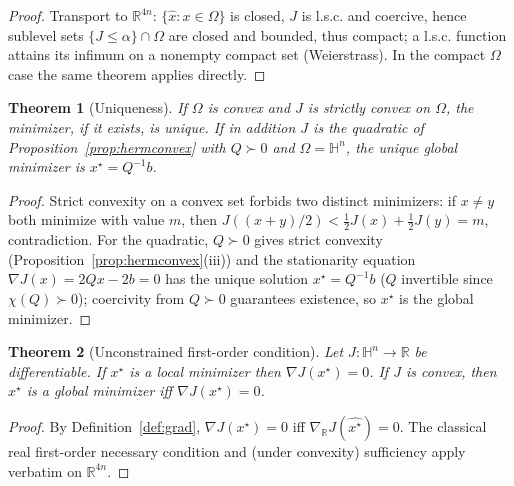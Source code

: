 \documentclass{amsart}
\newtheorem{theorem}{Theorem}
\theoremstyle{definition}
\newcommand{\HH}{\mathbb{H}}
\newcommand{\RR}{\mathbb{R}}
\begin{document}
\begin{proof}
Transport to $\RR^{4n}$: $\{\widehat x:x\in\Omega\}$ is closed,
$J$ is l.s.c. and coercive, hence sublevel sets
$\{J\le\alpha\}\cap\Omega$ are closed and bounded, thus compact; a
l.s.c. function attains its infimum on a nonempty compact set
(Weierstrass). In the compact $\Omega$ case the same theorem applies
directly.
\end{proof}

\begin{theorem}[Uniqueness]
\label{thm:uniqueness}
If $\Omega$ is convex and $J$ is strictly convex on $\Omega$, the
minimizer, if it exists, is unique. If in addition $J$ is the quadratic
of Proposition~\ref{prop:hermconvex} with $Q\succ0$ and
$\Omega=\HH^n$, the unique global minimizer is $x^\star=Q^{-1}b$.
\end{theorem}

\begin{proof}
Strict convexity on a convex set forbids two distinct minimizers: if
$x\ne y$ both minimize with value $m$, then
$J((x+y)/2)<\tfrac12J(x)+\tfrac12J(y)=m$, contradiction. For the
quadratic, $Q\succ0$ gives strict convexity
(Proposition~\ref{prop:hermconvex}(iii)) and the stationarity equation
$\nabla J(x)=2Qx-2b=0$ has the unique solution $x^\star=Q^{-1}b$
($Q$ invertible since $\chi(Q)\succ0$); coercivity from $Q\succ0$
guarantees existence, so $x^\star$ is the global minimizer.
\end{proof}

\begin{theorem}[Unconstrained first-order condition]
\label{thm:firstorder}
Let $J\colon\HH^n\to\RR$ be differentiable. If $x^\star$ is a local
minimizer then $\nabla J(x^\star)=0$. If $J$ is convex, then $x^\star$
is a global minimizer iff $\nabla J(x^\star)=0$.
\end{theorem}

\begin{proof}
By Definition~\ref{def:grad}, $\nabla J(x^\star)=0$ iff
$\nabla_\RR J(\widehat{x^\star})=0$. The classical real first-order
necessary condition and (under convexity) sufficiency apply verbatim on
$\RR^{4n}$.
\end{proof}
\end{document}
